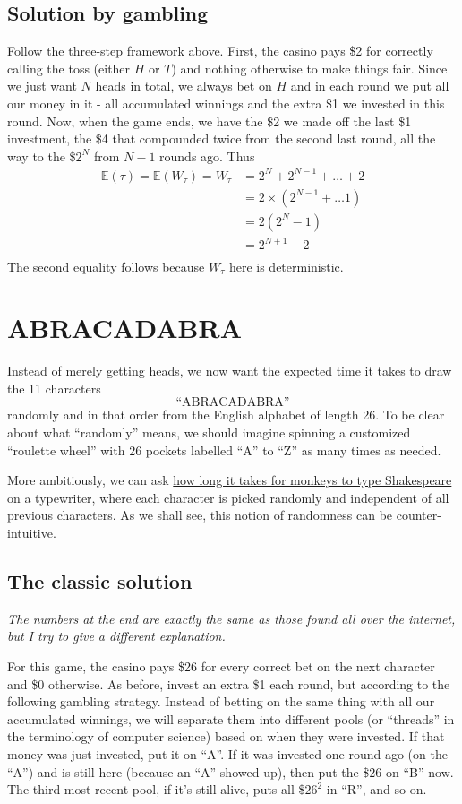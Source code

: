 \documentclass[11pt]{article}
\newcommand{\E}{\mathbb{E}}
\begin{document}
\subsection{Solution by gambling}
Follow the three-step framework above. First, the casino pays \$2 for correctly calling the toss (either $H$ or $T$) and nothing otherwise to make things fair. Since we just want $N$ heads in total, we always bet on $H$ and in each round we put all our money in it - all accumulated winnings and the extra \$1 we invested in this round. Now, when the game ends, we have the \$2 we made off the last \$1 investment, the \$4 that compounded twice from the second last round, all the way to the \$$2^N$ from $N-1$ rounds ago. Thus
\begin{align*}
\E(\tau) = \E(W_\tau) = W_\tau &= 2^N + 2^{N-1} + \dots + 2 \\
&= 2\times(2^{N-1} + \dots 1) \\
&= 2(2^N - 1) \\
&= \boxed{2^{N+1} - 2} \\
\end{align*}
The second equality follows because $W_\tau$ here is deterministic.

\section{ABRACADABRA}
Instead of merely getting heads, we now want the expected time it takes to draw the 11 characters $$\text{``ABRACADABRA''}$$ randomly and in that order from the English alphabet of length 26. To be clear about what ``randomly'' means, we should imagine spinning a customized ``roulette wheel'' with 26 pockets labelled ``A'' to ``Z'' as many times as needed.

More ambitiously, we can ask \href{https://en.wikipedia.org/wiki/Infinite_monkey_theorem}{how long it takes for monkeys to type Shakespeare} on a typewriter, where each character is picked randomly and independent of all previous characters. As we shall see, this notion of randomness can be counter-intuitive.

\subsection{The classic solution}
\textit{The numbers at the end are exactly the same as those found all over the internet, but I try to give a different explanation.}

For this game, the casino pays \$26 for every correct bet on the next character and \$0 otherwise. As before, invest an extra \$1 each round, but according to the following gambling strategy.
Instead of betting on the same thing with all our accumulated winnings, we will separate them into different pools (or ``threads'' in the terminology of computer science) based on when they were invested. If that money was just invested, put it on ``A''. If it was invested one round ago (on the ``A'') and is still here (because an ``A'' showed up), then put the \$26 on ``B'' now. The third most recent pool, if it's still alive, puts all \$$26^2$ in ``R'', and so on.
\end{document}
